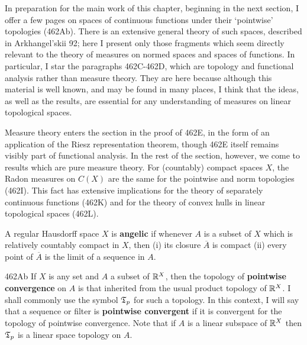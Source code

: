 
\def\chaptername{Pointwise compact sets of measurable functions}
\def\sectionname{Pointwise compact sets of continuous functions}


In preparation for the main work of this chapter, beginning in the next
section, I offer a few pages on spaces of continuous functions under
their `pointwise' topologies (462Ab).   There is an extensive general
theory of such spaces, described in {\smc Arkhangel'skii 92};  here I
present only those fragments which seem directly relevant to the theory
of measures on normed spaces and spaces of functions.   In particular,
I star the paragraphs 462C-462D, which are
topology and functional analysis
rather than measure theory.   They are here because although this
material is well known, and may be found in many places, I think that
the ideas, as well as the results, are essential for any understanding
of measures on linear topological spaces.

Measure theory enters the section in the proof of 462E, in the form of
an application of the Riesz representation theorem, though 462E itself
remains visibly part of functional analysis.   In the rest of the
section, however, we come to results which are pure measure theory.
For (countably) compact spaces $X$, the Radon measures on $C(X)$ are the
same for the pointwise and norm topologies (462I).
This fact has extensive implications for the theory of separately
continuous functions (462K) and for the theory of convex hulls in linear
topological spaces (462L).

 A regular Hausdorff space $X$ is {\bf
angelic} if whenever $A$ is a subset of $X$ which is relatively
countably compact in $X$, then (i) its closure $\overline{A}$ is compact
(ii) every point of $\overline{A}$ is the limit of a sequence in $A$.


\spheader 462Ab If $X$ is any set and $A$ a subset of $\Bbb R^X$, then
the topology of {\bf pointwise convergence} on $A$ is that inherited
from the usual product topology of $\Bbb R^X$.   I shall commonly use the symbol
$\frak T_p$ for such a
topology.   In this context, I will say that a sequence or filter is
{\bf pointwise convergent} if it is convergent for the topology of
pointwise convergence.   Note that if $A$ is a linear subspace of
$\Bbb R^X$ then
$\frak T_p$ is a linear space topology on $A$.

